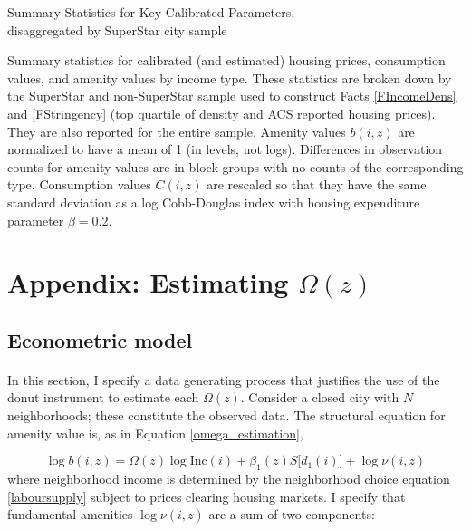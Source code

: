 \documentclass[12pt]{article}
\begin{document}
	\begin{landscape}
	\begin{table}[h]
		\caption{Summary Statistics for Key Calibrated Parameters, \\ disaggregated by SuperStar city sample}\label{table:CalibParaSuperstar}
		\makebox[\linewidth]{}
		\caption*{Summary statistics for calibrated (and estimated) housing prices, consumption values, and amenity values by income type. These statistics are broken down by the SuperStar and non-SuperStar sample used to construct Facts \ref{FIncomeDens} and \ref{FStringency} (top quartile of density and ACS reported housing prices). They are also reported for the entire sample. Amenity values $b(i, z)$ are normalized to have a mean of 1 (in levels, not logs). Differences in observation counts for amenity values are in block groups with no counts of the corresponding type. Consumption values $C(i, z)$ are rescaled so that they have the same standard deviation as a log Cobb-Douglas index with housing expenditure parameter $\beta = 0.2$.}
	\end{table}
	\end{landscape}

	
	\section{Appendix: Estimating $\Omega(z)$}\label{Appendix:Estimation}
	
	\subsection{Econometric model}\label{Appendix:EconometricModel}
	\paragraph*{}
	In this section, I specify a data generating process that justifies the use of the donut instrument to estimate each $\Omega(z)$. Consider a closed city with $N$ neighborhoods; these constitute the observed data. The structural equation for amenity value is, as in Equation \eqref{omega_estimation},
	
	\begin{equation*}
		\log b(i, z) = \Omega(z) \log \text{Inc}(i) + \beta_{1}(z)S\big[d_{1}(i)\big] + \log \nu(i, z)
	\end{equation*}
	where neighborhood income is determined by the neighborhood choice equation \eqref{laboursupply} subject to prices clearing housing markets. I specify that fundamental amenities $\log \nu(i, z)$ are a sum of two components:
	
\end{document}
